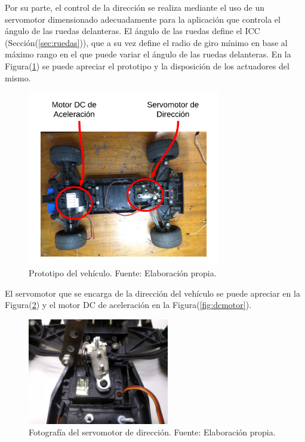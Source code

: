     Por su parte, el control de la dirección se realiza mediante el uso de un servomotor dimensionado adecuadamente para la aplicación 
    que controla el ángulo de las ruedas delanteras. El ángulo de las ruedas define el ICC (Sección(\ref{sec:ruedas})), que a su vez 
    define el radio de giro mínimo en base al máximo rango en el que puede variar el ángulo de las ruedas delanteras. En la 
    Figura(\ref{fig:actuadores}) se puede apreciar el prototipo y la disposición de los actuadores del mismo.

    \begin{figure}[!h] 
        \centering
        \includegraphics[width=0.75\textwidth]{img/actuadores}
        \caption[Prototipo del vehículo]{Prototipo del vehículo. Fuente: Elaboración propia. }
        \label{fig:actuadores}
    \end{figure}

    El servomotor que se encarga de la dirección del vehículo se puede apreciar en la Figura(\ref{fig:servo}) y el motor DC de aceleración 
    en la Figura(\ref{fig:dcmotor}).

    \begin{figure}[!h] 
        \centering
        \includegraphics[width=0.55\textwidth]{img/servo}
        \caption[Fotografía del servomotor de dirección]{Fotografía del servomotor de dirección. Fuente: Elaboración propia. }
        \label{fig:servo}
    \end{figure}

